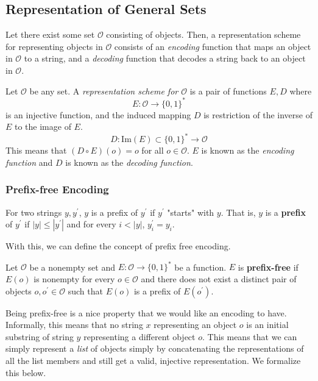 \documentclass{article}
\begin{document}
  \subsection{Representation of General Sets}
  Let there exist some set $\mathcal{O}$ consisting of objects. Then, a representation scheme for representing objects in $\mathcal{O}$ consists of an \textit{encoding} function that maps an object in $\mathcal{O}$ to a string, and a \textit{decoding} function that decodes a string back to an object in $\mathcal{O}$. 

  \begin{definition}
  Let $\mathcal{O}$ be any set. A \textit{representation scheme for $\mathcal{O}$} is a pair of functions $E, D$ where 
  \[E: \mathcal{O} \longrightarrow \{0,1\}^\ast\]
  is an injective function, and the induced mapping $D$ is restriction of the inverse of $E$ to the image of $E$. 
  \[D: \mathrm{Im}(E) \subset \{0,1\}^\ast \longrightarrow \mathcal{O}\]
  This means that $(D \circ E) (o) = o$ for all $o \in \mathcal{O}$. $E$ is known as the \textit{encoding function} and $D$ is known as the \textit{decoding function}. 
  \end{definition}

  \subsubsection{Prefix-free Encoding}
  \begin{definition}[Prefix]
  For two strings $y, y^\prime$, $y$ is a prefix of $y^\prime$ if $y^\prime$ "starts" with $y$. That is, $y$ is a \textbf{prefix} of $y^\prime$ if $|y| \leq |y^\prime|$ and for every $i<|y|$, $y_i^\prime = y_i$. 
  \end{definition}

  With this, we can define the concept of prefix free encoding. 

  \begin{definition}
  Let $\mathcal{O}$ be a nonempty set and $E: \mathcal{O} \longrightarrow \{0,1\}^\ast$ be a function. $E$ is \textbf{prefix-free} if $E(o)$ is nonempty for every $o \in \mathcal{O}$ and there does not exist a distinct pair of objects $o, o^\prime \in \mathcal{O}$ such that $E(o)$ is a prefix of $E(o^\prime)$. 
  \end{definition}

  Being prefix-free is a nice property that we would like an encoding to have. Informally, this means that no string $x$ representing an object $o$ is an initial substring of string $y$ representing a different object $o$. This means that we can simply represent a \textit{list} of objects simply by concatenating the representations of all the list members and still get a valid, injective representation. We formalize this below.
\end{document}
